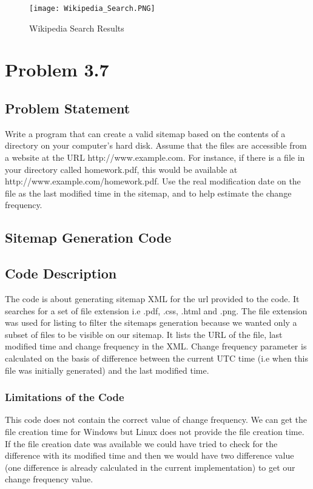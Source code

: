 \documentclass[12pt]{report}
\begin{document}
\begin{figure}[ht]
  \centering
  \texttt{[image: Wikipedia\_Search.PNG]}
  \caption{Wikipedia Search Results}
  \label{fig:11}
\end{figure}

\chapter{Problem 3.7}
\section{Problem Statement}
Write a program that can create a valid sitemap based on the contents of a directory on your computer’s hard disk. Assume that the files are accessible from a website at the URL http://www.example.com. For instance, if there is a file in your directory called homework.pdf, this would be available at http://www.example.com/homework.pdf. Use the real modification date on the file as the last modified time in the sitemap, and to help estimate the change frequency.
\section{Sitemap Generation Code}

\section{Code Description}
The code is about generating sitemap XML for the url provided to the code. It searches for a set of file extension i.e .pdf, .css, .html and .png. \cite{9} The file extension was used for listing to filter the sitemaps generation because we wanted only a subset of files to be visible on our sitemap. It lists the URL of the file, last modified time and change frequency in the XML. Change frequency parameter is calculated on the basis of difference between the current UTC time (i.e when this file was initially generated) and the last modified time. 
\subsection{Limitations of the Code}
This code does not contain the correct value of change frequency. We can get the file creation time for Windows but Linux does not provide the file creation time. \cite{10} If the file creation date was available we could have tried to check for the difference with its modified time and then we would have two difference value (one difference is already calculated in the current implementation) to get our change frequency value.  
\end{document}
